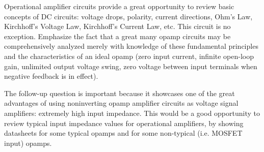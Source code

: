 
Operational amplifier circuits provide a great opportunity to review basic concepts of DC circuits: voltage drops, polarity, current directions, Ohm's Law, Kirchhoff's Voltage Law, Kirchhoff's Current Law, etc.  This circuit is no exception.  Emphasize the fact that a great many opamp circuits may be comprehensively analyzed merely with knowledge of these fundamental principles and the characteristics of an ideal opamp (zero input current, infinite open-loop gain, unlimited output voltage swing, zero voltage between input terminals when negative feedback is in effect).

The follow-up question is important because it showcases one of the great advantages of using noninverting opamp amplifier circuits as voltage signal amplifiers: extremely high input impedance.  This would be a good opportunity to review typical input impedance values for operational amplifiers, by showing datasheets for some typical opamps and for some non-typical (i.e. MOSFET input) opamps.




